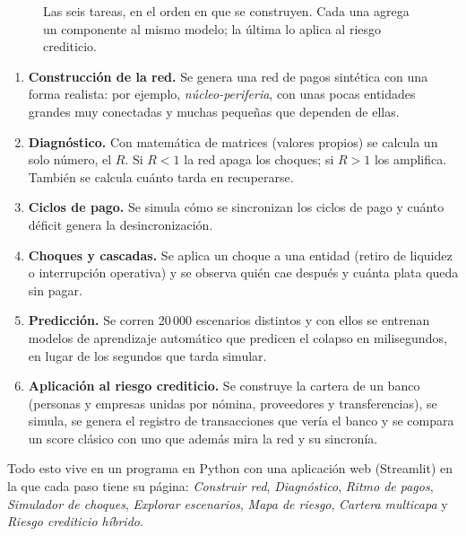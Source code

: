 \begin{figure}[h]
\centering
{}
\caption{Las seis tareas, en el orden en que se construyen. Cada una agrega un
componente al mismo modelo; la última lo aplica al riesgo crediticio.}
\label{fig:seis}
\end{figure}

\begin{enumerate}
\item \textbf{Construcción de la red.} Se genera una red de pagos sintética con una forma
realista: por ejemplo, \emph{núcleo-periferia}, con unas pocas entidades grandes muy
conectadas y muchas pequeñas que dependen de ellas.
\item \textbf{Diagnóstico.} Con matemática de matrices (valores propios) se calcula
un solo número, el  $R$. Si $R<1$ la red apaga los
choques; si $R>1$ los amplifica. También se calcula cuánto tarda en recuperarse.
\item \textbf{Ciclos de pago.} Se simula cómo se sincronizan los ciclos de pago y
cuánto déficit genera la desincronización.
\item \textbf{Choques y cascadas.} Se aplica un choque a una entidad (retiro de liquidez o
interrupción operativa) y se observa quién cae después y cuánta plata queda sin pagar.
\item \textbf{Predicción.} Se corren 20\,000 escenarios distintos y con ellos se
entrenan modelos de aprendizaje automático que predicen el colapso en milisegundos,
en lugar de los segundos que tarda simular.
\item \textbf{Aplicación al riesgo crediticio.} Se construye la cartera de un banco (personas y
empresas unidas por nómina, proveedores y transferencias), se simula, se genera el
registro de transacciones que vería el banco y se compara un score clásico con uno
que además mira la red y su sincronía.
\end{enumerate}

Todo esto vive en un programa en Python con una aplicación web (Streamlit) en la que
cada paso tiene su página: \emph{Construir red}, \emph{Diagnóstico}, \emph{Ritmo de
pagos}, \emph{Simulador de choques}, \emph{Explorar escenarios}, \emph{Mapa de
riesgo}, \emph{Cartera multicapa} y \emph{Riesgo crediticio híbrido}.
